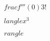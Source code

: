 \documentclass[preview]{standalone}
\begin{document}
\begin{align*}
\quad\\frac{f'''(0)}{3!}\quad\\\quad\\langle x^3 \quad\\\quad\\rangle
\end{align*}
\end{document}
